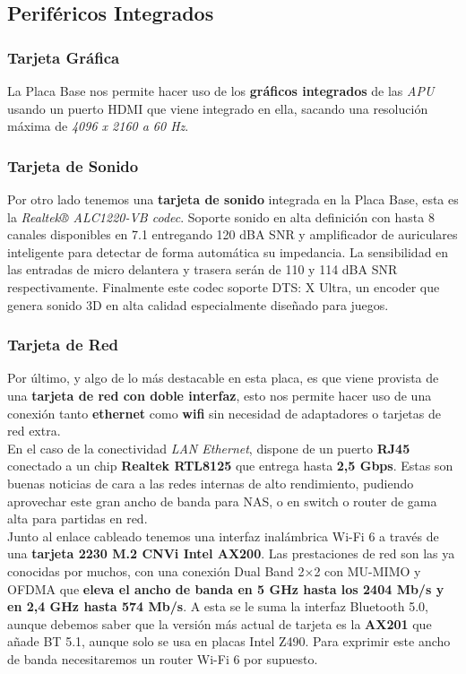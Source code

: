 \documentclass{article}
\begin{document}
    
    \subsection{Periféricos Integrados}
      \subsubsection{Tarjeta Gráfica}
        La Placa Base nos permite hacer uso de los \textbf{gráficos integrados} de las \textit{APU} usando un puerto HDMI que viene integrado en ella, sacando una resolución máxima de \textit{4096 x 2160 a 60 Hz}.
        
      \subsubsection{Tarjeta de Sonido}
        Por otro lado tenemos una \textbf{tarjeta de sonido} integrada en la Placa Base, esta es la \textit{Realtek® ALC1220-VB codec}.  Soporte sonido en alta definición con hasta 8 canales disponibles en 7.1 entregando 
        120 dBA SNR y amplificador de auriculares inteligente para detectar de forma automática su impedancia. La sensibilidad en las entradas de micro delantera y trasera serán de 110 y 114 dBA SNR respectivamente. 
        Finalmente este codec soporte DTS: X Ultra, un encoder que genera sonido 3D en alta calidad especialmente diseñado para juegos.
        
      \subsubsection{Tarjeta de Red}
        Por último, y algo de lo más destacable en esta placa, es que viene provista de una \textbf{tarjeta de red con doble interfaz}, esto nos permite hacer uso de una conexión tanto \textbf{ethernet} como \textbf{wifi} 
        sin necesidad de adaptadores o tarjetas de red extra.
        \\ 
        En el caso de la conectividad \textit{LAN Ethernet}, dispone de un puerto \textbf{RJ45} conectado a un chip \textbf{Realtek RTL8125} que entrega hasta \textbf{2,5 Gbps}. 
        Estas son buenas noticias de cara a las redes internas de alto rendimiento, pudiendo aprovechar este gran ancho de banda para NAS, o en switch o router de gama alta para partidas en red.
        \\
        Junto al enlace cableado tenemos una interfaz inalámbrica Wi-Fi 6 a través de una \textbf{tarjeta 2230 M.2 CNVi Intel AX200}. Las prestaciones de red son las ya conocidas por muchos, con una conexión Dual Band 2×2 con MU-MIMO 
        y OFDMA que \textbf{eleva el ancho de banda en 5 GHz hasta los 2404 Mb/s y en 2,4 GHz hasta 574 Mb/s}. A esta se le suma la interfaz Bluetooth 5.0, aunque debemos saber que la versión más actual de tarjeta es la \textbf{AX201} 
        que añade BT 5.1, aunque solo se usa en placas Intel Z490. Para exprimir este ancho de banda necesitaremos un router Wi-Fi 6 por supuesto.
  \newpage
\end{document}
